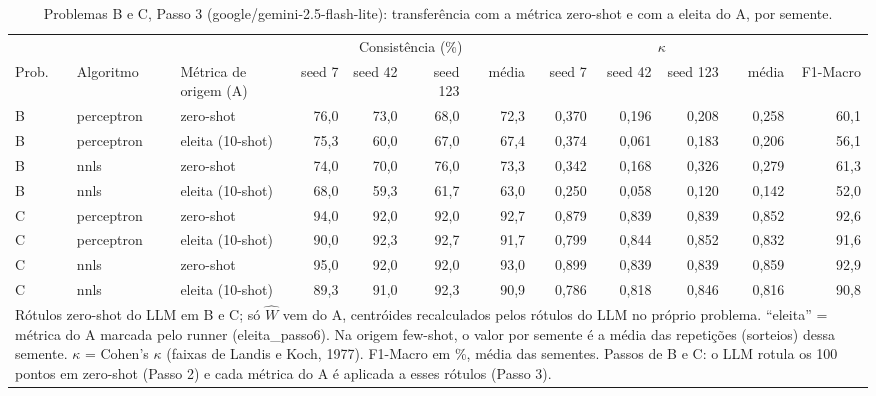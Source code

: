 \begin{table}[htbp]
\centering
\footnotesize
\caption{Problemas B e C, Passo 3 (google/gemini-2.5-flash-lite): transferência com a métrica zero-shot e com a eleita do A, por semente.}
\label{tab:BC_passo3_por_semente_flashlite}
\begin{tabular}{lllrrrrrrrrr}
\toprule
 &  &  & \multicolumn{4}{c}{Consistência (\%)} & \multicolumn{4}{c}{$\kappa$} &  \\ \cmidrule(lr){4-7} \cmidrule(lr){8-11}
Prob. & Algoritmo & Métrica de origem (A) & seed 7 & seed 42 & seed 123 & média & seed 7 & seed 42 & seed 123 & média & F1-Macro \\
\midrule
B & perceptron & zero-shot & 76,0 & 73,0 & 68,0 & 72,3 & 0,370 & 0,196 & 0,208 & 0,258 & 60,1 \\
B & perceptron & eleita (10-shot) & 75,3 & 60,0 & 67,0 & 67,4 & 0,374 & 0,061 & 0,183 & 0,206 & 56,1 \\
B & nnls & zero-shot & 74,0 & 70,0 & 76,0 & 73,3 & 0,342 & 0,168 & 0,326 & 0,279 & 61,3 \\
B & nnls & eleita (10-shot) & 68,0 & 59,3 & 61,7 & 63,0 & 0,250 & 0,058 & 0,120 & 0,142 & 52,0 \\
\midrule
C & perceptron & zero-shot & 94,0 & 92,0 & 92,0 & 92,7 & 0,879 & 0,839 & 0,839 & 0,852 & 92,6 \\
C & perceptron & eleita (10-shot) & 90,0 & 92,3 & 92,7 & 91,7 & 0,799 & 0,844 & 0,852 & 0,832 & 91,6 \\
C & nnls & zero-shot & 95,0 & 92,0 & 92,0 & 93,0 & 0,899 & 0,839 & 0,839 & 0,859 & 92,9 \\
C & nnls & eleita (10-shot) & 89,3 & 91,0 & 92,3 & 90,9 & 0,786 & 0,818 & 0,846 & 0,816 & 90,8 \\
\bottomrule
\multicolumn{12}{p{0.95\linewidth}}{\footnotesize Rótulos zero-shot do LLM em B e C; só $\hat{W}$ vem do A, centróides recalculados pelos rótulos do LLM no próprio problema. ``eleita'' = métrica do A marcada pelo runner (eleita\_passo6). Na origem few-shot, o valor por semente é a média das repetições (sorteios) dessa semente. $\kappa$ = Cohen's $\kappa$ (faixas de Landis e Koch, 1977). F1-Macro em \%, média das sementes. Passos de B e C: o LLM rotula os 100 pontos em zero-shot (Passo 2) e cada métrica do A é aplicada a esses rótulos (Passo 3).} \\
\end{tabular}
\end{table}
